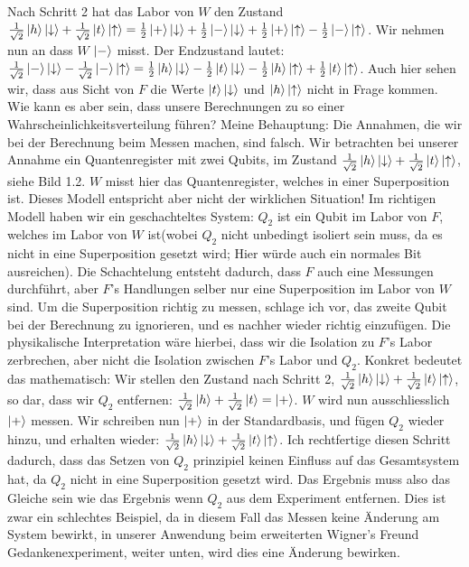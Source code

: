 \documentclass[a4paper]{article}
\begin{document}
Nach Schritt 2 hat das Labor von $W$ den Zustand $\frac{1}{\sqrt{2}} \ket{h}\ket{\downarrow} + \frac{1}{\sqrt{2}} \ket{t}\ket{\uparrow} = \frac{1}{2}\ket{+}\ket{\downarrow} + \frac{1}{2}\ket{-}\ket{\downarrow} + \frac{1}{2}\ket{+}\ket{\uparrow} - \frac{1}{2}\ket{-}\ket{\uparrow}$. Wir nehmen nun an dass $W$ $\ket{-}$ misst. Der Endzustand lautet: $\frac{1}{\sqrt{2}} \ket{-}\ket{\downarrow} - \frac{1}{\sqrt{2}} \ket{-}\ket{\uparrow} = \frac{1}{2}\ket{h}\ket{\downarrow} - \frac{1}{2}\ket{t}\ket{\downarrow} - \frac{1}{2}\ket{h}\ket{\uparrow} + \frac{1}{2}\ket{t}\ket{\uparrow}$. Auch hier sehen wir, dass aus Sicht von $F$ die Werte $\ket{t}\ket{\downarrow}$ und $\ket{h}\ket{\uparrow}$ nicht in Frage kommen. Wie kann es aber sein, dass unsere Berechnungen zu so einer Wahrscheinlichkeitsverteilung führen? Meine Behauptung: Die Annahmen, die wir bei der Berechnung beim Messen machen, sind falsch. Wir betrachten bei unserer Annahme ein Quantenregister mit zwei Qubits, im Zustand $\frac{1}{\sqrt{2}} \ket{h}\ket{\downarrow} + \frac{1}{\sqrt{2}} \ket{t}\ket{\uparrow}$, siehe Bild 1.2. $W$ misst hier das Quantenregister, welches in einer Superposition ist. Dieses Modell entspricht aber nicht der wirklichen Situation! Im richtigen Modell haben wir ein geschachteltes System: $Q_2$ ist ein Qubit im Labor von $F$, welches im Labor von $W$ ist(wobei $Q_2$ nicht unbedingt isoliert sein muss, da es nicht in eine Superposition gesetzt wird; Hier würde auch ein normales Bit ausreichen). Die Schachtelung entsteht dadurch, dass $F$ auch eine Messungen durchführt, aber $F$'s Handlungen selber nur eine Superposition im Labor von $W$ sind. Um die Superposition richtig zu messen, schlage ich vor, das zweite Qubit bei der Berechnung zu ignorieren, und es nachher wieder richtig einzufügen. Die physikalische Interpretation wäre hierbei, dass wir die Isolation zu $F$'s Labor zerbrechen, aber nicht die Isolation zwischen $F$'s Labor und $Q_2$. Konkret bedeutet das mathematisch: Wir stellen den Zustand nach Schritt 2, $\frac{1}{\sqrt{2}} \ket{h}\ket{\downarrow} + \frac{1}{\sqrt{2}} \ket{t}\ket{\uparrow}$, so dar, dass wir $Q_2$ entfernen: $\frac{1}{\sqrt{2}} \ket{h} + \frac{1}{\sqrt{2}} \ket{t} = \ket{+}$. $W$ wird nun ausschliesslich $\ket{+}$ messen. Wir  schreiben nun $\ket{+}$ in der Standardbasis, und fügen $Q_2$ wieder hinzu, und erhalten wieder: $\frac{1}{\sqrt{2}} \ket{h}\ket{\downarrow} + \frac{1}{\sqrt{2}} \ket{t}\ket{\uparrow}$. Ich rechtfertige diesen Schritt dadurch, dass das Setzen von $Q_2$ prinzipiel keinen Einfluss auf das Gesamtsystem hat, da $Q_2$ nicht in eine Superposition gesetzt wird. Das Ergebnis muss also das Gleiche sein wie das Ergebnis wenn $Q_2$ aus dem Experiment entfernen. Dies ist zwar ein schlechtes Beispiel, da in diesem Fall das Messen keine Änderung am System bewirkt, in unserer Anwendung beim erweiterten Wigner's Freund Gedankenexperiment, weiter unten, wird dies eine Änderung bewirken.
\end{document}
